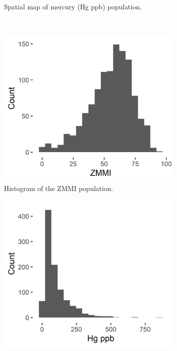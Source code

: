 \documentclass[]{elsarticle} %
\begin{document}
\begin{figure}
\begin{subfigure}{0.49\textwidth}
  \caption{Spatial map of mercury (Hg ppb) population.}
  \label{fig:mercury_map}
\end{subfigure} \\
\begin{subfigure}{0.49\textwidth}
  \centering
  \includegraphics[width = 1\linewidth]{figures/zmmi_hist.jpeg}
  \caption{Histogram of the ZMMI population.}
  \label{fig:zmmi_hist}
\end{subfigure}
\begin{subfigure}{0.49\textwidth}
  \centering
  \includegraphics[width = 1\linewidth]{figures/mercury_hist.jpeg}

\end{subfigure}
\end{figure}
\end{document}
